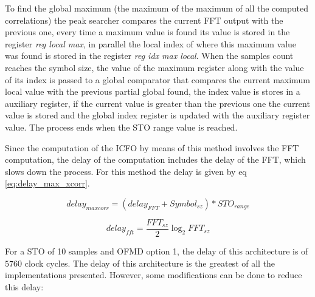 To find the global maximum (the maximum of the maximum of all the computed correlations) the peak searcher compares the current FFT output with the previous one, every time a maximum value is found its value is stored in the register \emph{reg local max}, in parallel the local index of where this maximum value was found is stored in the register \emph{reg idx max local}. When the samples count reaches the symbol size, the value of the maximum register along with the value of its index is passed to a global comparator that compares the current maximum local value with the previous partial global found, the index value is stores in a auxiliary register, if the current value is greater than the previous one the current value is stored and the global index register is updated with the auxiliary register value. The process ends when the STO range value is reached. 

Since the computation of the ICFO by means of this method involves the FFT computation, the delay of the computation includes the delay of the FFT, which slows down the process. For this method the delay is given by eq \ref{eq:delay_max_xcorr}.

\begin{equation} 
delay_{maxcorr} = (delay_{FFT} + Symbol_{sz})*STO_{range} 
\label{eq:delay_max_xcorr}
\end{equation}

\begin{equation} 
delay_{fft} = \frac{FFT_{sz}}{2}\log_2{FFT_{sz}}  
\label{eq:delay_max_xcorr}
\end{equation}


For a STO of 10 samples and OFMD option 1, the delay of this architecture is of $5760$ clock cycles. The delay of this architecture is the greatest of all the implementations presented. However, some modifications can be done to reduce this delay:

